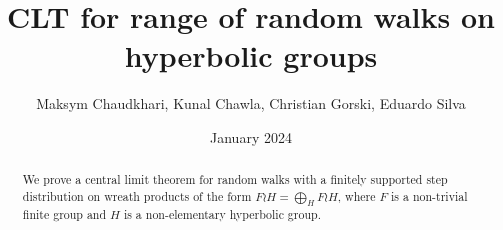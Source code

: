 \documentclass{amsart}
\title{CLT for range of random walks on hyperbolic groups}
\author{Maksym Chaudkhari, Kunal Chawla, Christian Gorski, Eduardo Silva }
\date{January 2024}
\begin{document}
	\begin{abstract} 
We prove a central limit theorem for random walks with a finitely supported step distribution on wreath products of the form $F\wr H=\bigoplus_H F\wr H $, where $F$ is a non-trivial finite group and $H$ is a non-elementary hyperbolic group.
	\end{abstract}
\maketitle




%





\end{document}
